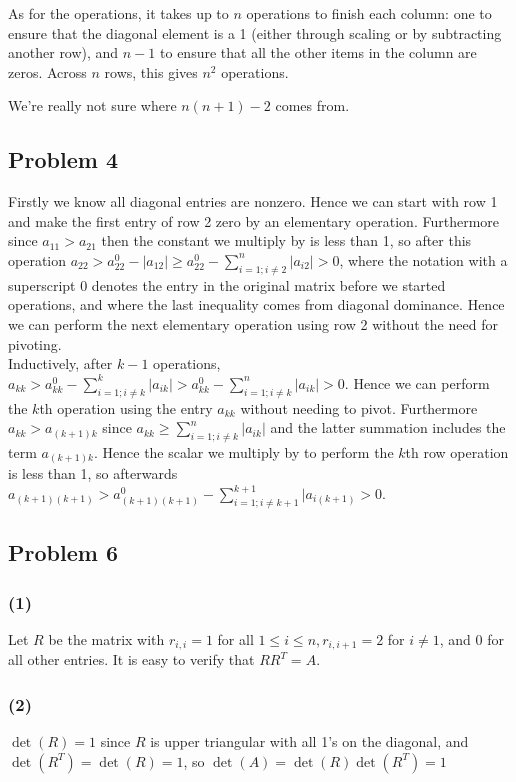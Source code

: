 \documentclass{article}
\begin{document}
As for the operations, it takes up to $n$ operations to finish each column:
one to ensure that the diagonal element is a 1 (either through scaling or by
subtracting another row), and $n-1$ to ensure that all the other items in the
column are zeros. Across $n$ rows, this gives $n^2$ operations.

We're really not sure where $n(n+1) - 2$ comes from.

\subsection{Problem 4}
Firstly we know all diagonal entries are nonzero. Hence we can start with row 1 and make the first entry of row 2 zero by an elementary operation. Furthermore since $a_{11}>a_{21}$ then the constant we multiply by is less than 1, so after this operation $a_{22}> a_{22}^0 - |a_{12}|\ge a_{22}^0 - \displaystyle\sum_{i=1; i\neq 2}^n |a_{i2}|>0$, where the notation with a superscript 0 denotes the entry in the original matrix before we started operations, and where the last inequality comes from diagonal dominance. Hence we can perform the next elementary operation using row 2 without the need for pivoting.
\\Inductively, after $k-1$ operations, $a_{kk}>a_{kk}^0 - \displaystyle\sum_{i=1; i\neq k}^k |a_{ik}| > a_{kk}^0 - \displaystyle\sum_{i=1; i\neq k}^n |a_{ik}| > 0$. Hence we can perform the $k$th operation using the entry $a_{kk}$ without needing to pivot. Furthermore $a_{kk}>a_{(k+1)k}$ since $a_{kk}\ge \displaystyle\sum_{i=1; i\neq k}^n |a_{ik}|$ and the latter summation includes the term $a_{(k+1)k}$. Hence the scalar we multiply by to perform the $k$th row operation is less than 1, so afterwards $a_{(k+1)(k+1)}>a_{(k+1)(k+1)}^0 - \displaystyle\sum_{i=1; i\neq k+1}^{k+1} |a_{i(k+1)}>0$. 

\subsection{Problem 6}
\subsubsection{(1)} Let $R$ be the matrix with $r_{i,i}=1$ for all $1\le i\le n, r_{i,i+1}=2$ for $i\neq 1$, and 0 for all other entries. It is easy to verify that $RR^T=A$. 
\subsubsection{(2)} $\det(R)=1$ since $R$ is upper triangular with all 1's on the diagonal, and $\det(R^T)=\det(R)=1$, so $\det(A)=\det(R)\det(R^T)=1$
\end{document}
